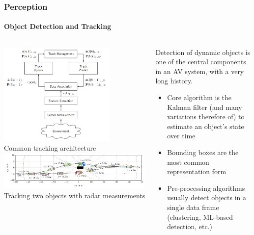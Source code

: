 \begin{frame}
\frametitle{Perception}
\framesubtitle{Object Detection and Tracking}
\begin{columns}[T]
    \begin{column}{.45\textwidth}
        \centering
        \includegraphics[width=0.75\textwidth]{images/aeberhard_tracking.png}\\
        \tiny{Common tracking architecture \cite{AeberhardDissertation}}\\
        \vspace{0.25cm}
        \includegraphics[width=\textwidth]{images/scheel_radar_tracking.png}\\
        \tiny{Tracking two objects with radar measurements \cite{Scheel2019}}
    \end{column}
    \begin{column}{.55\textwidth}
        Detection of dynamic objects is one of the central components in an
        AV system, with a very long history.
        \begin{itemize}
            \item Core algorithm is the Kalman filter \cite{Kalman1960}
                (and many variations therefore of) to estimate an object's
                state over time
            \item Bounding boxes are the most common representation form
            \item Pre-processing algorithms usually detect objects in a single
                data frame (clustering, ML-based detection, etc.)
        \end{itemize}
    \end{column}
\end{columns}
\end{frame}

